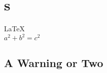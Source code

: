 \documentclass{article}
\begin{document}
               
 
 
\section{s}          
\LaTeX \,\\ 
 $a^2+b^2=c^2$

\subsection{A Warning or Two}  

\end{document}
